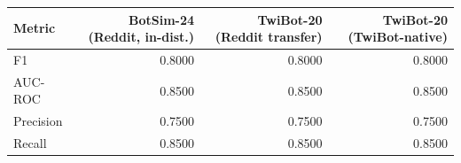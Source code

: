 \begin{tabular}{lrrr}
\toprule
Metric & BotSim-24 (Reddit, in-dist.) & TwiBot-20 (Reddit transfer) & TwiBot-20 (TwiBot-native) \\
\midrule
F1 & 0.8000 & 0.8000 & 0.8000 \\
AUC-ROC & 0.8500 & 0.8500 & 0.8500 \\
Precision & 0.7500 & 0.7500 & 0.7500 \\
Recall & 0.8500 & 0.8500 & 0.8500 \\
\bottomrule
\end{tabular}
